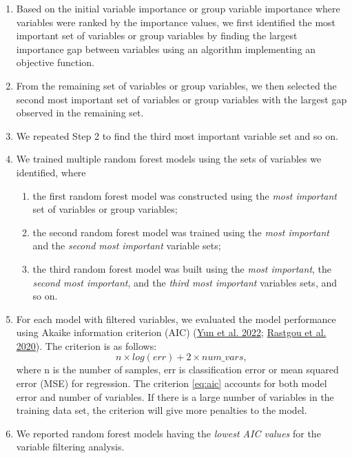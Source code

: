 \documentclass[
  11pt,
  oneside]{book}
\providecommand{\tightlist}{%
  \setlength{\itemsep}{0pt}\setlength{\parskip}{0pt}}
\begin{document}
\begin{enumerate}
\def\labelenumi{\arabic{enumi}.}
\item
  Based on the initial variable importance or group variable importance where variables were ranked by the importance values, we first identified the most important set of variables or group variables by finding the largest importance gap between variables using an algorithm implementing an objective function.
\item
  From the remaining set of variables or group variables, we then selected the second most important set of variables or group variables with the largest gap observed in the remaining set.
\item
  We repeated Step 2 to find the third most important variable set and so on.
\item
  We trained multiple random forest models using the sets of variables we identified, where

  \begin{enumerate}
  \def\labelenumii{\alph{enumii}.}
  \tightlist
  \item
    the first random forest model was constructed using the \emph{most important} set of variables or group variables;
  \item
    the second random forest model was trained using the \emph{most important} and the \emph{second most important} variable sets;
  \item
    the third random forest model was built using the \emph{most important}, the \emph{second most important}, and the \emph{third most important} variables sets, and so on.
  \end{enumerate}
\item
  For each model with filtered variables, we evaluated the model performance using Akaike information criterion (AIC) (\protect\hyperlink{ref-Yun:2022tn}{Yun et al. 2022}; \protect\hyperlink{ref-rastgou2020estimating}{Rastgou et al. 2020}). The criterion is as follows:
  \begin{equation}
  n \times log(err) + 2 \times num\_vars,
  \label{eq:aic}
  \end{equation}
  where n is the number of samples, err is classification error or mean squared error (MSE) for regression. The criterion \eqref{eq:aic} accounts for both model error and number of variables. If there is a large number of variables in the training data set, the criterion will give more penalties to the model.
\item
  We reported random forest models having the \emph{lowest AIC values} for the variable filtering analysis.
\end{enumerate}
\end{document}

